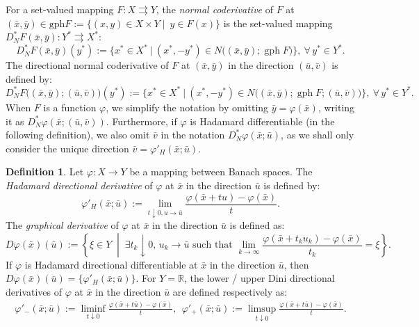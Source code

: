 \documentclass[12pt,twoside,reqno]{amsart}
\theoremstyle{definition}
\newtheorem{definition}[theorem]{Definition}
\numberwithin{equation}{section}
\begin{document}
For a set-valued mapping $F: X \rightrightarrows Y$, the \emph{normal coderivative} of $F$ at $(\bar{x}, \bar{y}) \in \text{gph} F:=\{(x,y)\in X\times Y \mid ~y\in F(x)\}$ is the set-valued mapping $D_N^* F(\bar{x}, \bar{y}): Y^* \rightrightarrows X^*$: 
\[
D_N^*F(\bar x, \bar y)(y^*)
:= \big\{
x^* \in X^* ~\big|~ 
(x^*, -y^*) \in N\big((\bar x, \bar y); \operatorname{gph} F\big)
\big\}, ~\forall\, y^* \in Y^*.
\]
The directional normal coderivative of $F$ at $(\bar x, \bar y)$ in the direction $(\bar u, \bar v)$ is defined by:  
\[
D_N^*F\big((\bar x, \bar y); (\bar u, \bar v)\big)(y^*)
:= \big\{
x^* \in X^* ~\big|~ 
(x^*, -y^*) \in N\big((\bar x, \bar y); \operatorname{gph} F; (\bar u, \bar v)\big)
\big\}, ~\forall\, y^* \in Y^*.
\]
When $F$ is a function $\varphi$, we simplify the notation by omitting $\bar y = \varphi(\bar x)$, writing it as $D_N^* \varphi(\bar x; (\bar u, \bar v))$. Furthermore, if $\varphi$ is Hadamard differentiable (in the following definition), we also omit $\bar v$ in the notation $D_N^* \varphi(\bar x; \bar u)$, as we shall only consider the unique direction $\bar v = \varphi'_H(\bar x; \bar u)$. 

\begin{definition}\label{defn of hadamard derivative} 
Let $\varphi: X \to Y$ be a mapping between Banach spaces. The \emph{Hadamard directional derivative} of $\varphi$ at $\bar x$ in the direction $\bar u$ is defined by:
\begin{equation}
    \varphi'_H(\bar x; \bar u)
    := 
    \lim_{t\downarrow 0, u \to \bar u} 
    \frac{\varphi(\bar x + t u) - \varphi(\bar x)}{t}. 
\end{equation}
The \textit{graphical derivative} of $\varphi$ at $\bar x$ in the direction $\bar u$ is defined as:
\[
D\varphi(\bar x)(\bar u) := \left\{ \xi \in Y \;\middle|\; \exists t_k \downarrow 0, \, u_k \to \bar u \text{ such that } \lim_{k \to \infty} \frac{\varphi(\bar x + t_k u_k) - \varphi(\bar x)}{t_k} = \xi \right\}.
\]
If $\varphi$ is Hadamard directional differentiable at $\bar x$ in the direction $\bar u$, then $D\varphi(\bar x)(\bar u)=\{ \varphi'_H(\bar x; \bar u)\}$.  
For $Y=\mathbb{R}$, the lower / upper Dini directional derivatives of $\varphi$ at $\bar{x}$ in the direction $\bar u$ are defined respectively as:
    \begin{align*}
        \varphi'_{-}(\bar{x}; \bar u) := \liminf_{t \downarrow 0} \frac{\varphi(\bar{x} + t \bar u) - \varphi(\bar{x})}{t}, ~~
        \varphi'_{+}(\bar{x}; \bar u) := \limsup_{t \downarrow 0} \frac{\varphi(\bar{x} + t \bar u) - \varphi(\bar{x})}{t}.
    \end{align*}
\end{definition}
\end{document}

